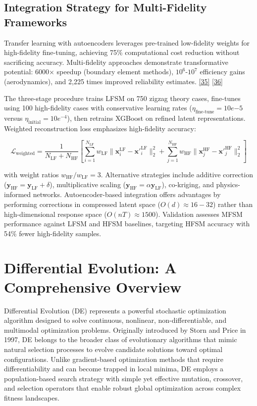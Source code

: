 \documentclass[12pt,a4paper]{report}
\begin{document}
\subsection{Integration Strategy for Multi-Fidelity Frameworks}

Transfer learning with autoencoders leverages pre-trained low-fidelity weights for high-fidelity fine-tuning, achieving 75\% computational cost reduction without sacrificing accuracy. Multi-fidelity approaches demonstrate transformative potential: 6000× speedup (boundary element methods), $10^6$-$10^7$ efficiency gains (aerodynamics), and 2,225 times improved reliability estimates. \href{https://www.mdpi.com/2076-3417/11/21/10317}{[35]} \href{https://arxiv.org/abs/2410.15047}{[36]}

The three-stage procedure trains LFSM on 750 zigzag theory cases, fine-tunes using 100 high-fidelity cases with  conservative learning rates ($\eta_{\text{fine-tune}} = 10e{-5}$ versus $\eta_{\text{initial}} = 10e^{-4}$), then retrains XGBoost on refined latent representations. Weighted reconstruction loss emphasizes high-fidelity accuracy:

\begin{equation}
\mathcal{L}_{\text{weighted}} = \frac{1}{N_{\text{LF}} + N_{\text{HF}}} \left[ \sum_{i=1}^{N_{\text{LF}}} w_{\text{LF}} \|\mathbf{x}^{\text{LF}}_i - \mathbf{x}'^{\text{LF}}_i\|^2_2 + \sum_{j=1}^{N_{\text{HF}}} w_{\text{HF}} \|\mathbf{x}^{\text{HF}}_j - \mathbf{x}'^{\text{HF}}_j\|^2_2 \right]
\end{equation}

with weight ratios $w_{\text{HF}}/w_{\text{LF}} = 3$. Alternative strategies include additive correction ($\mathbf{y}_{\text{HF}} = \mathbf{y}_{\text{LF}} + \delta$), multiplicative scaling ($\mathbf{y}_{\text{HF}} = \alpha \mathbf{y}_{\text{LF}}$), co-kriging, and physics-informed networks. Autoencoder-based integration offers advantages by performing corrections in compressed latent space ($O(d) \approx 16-32$) rather than high-dimensional response space ($O(nT) \approx 1500$). Validation assesses MFSM performance against LFSM and HFSM baselines, targeting HFSM accuracy with 54\% fewer high-fidelity samples.

\section{Differential Evolution: A Comprehensive Overview}
\label{sec:differential_evolution}

Differential Evolution (DE) represents a powerful stochastic optimization algorithm designed to solve continuous, nonlinear, non-differentiable, and multimodal optimization problems. Originally introduced by Storn and Price in 1997, DE belongs to the broader class of evolutionary algorithms that mimic natural selection processes to evolve candidate solutions toward optimal configurations. Unlike gradient-based optimization methods that require differentiability and can become trapped in local minima, DE employs a population-based search strategy with simple yet effective mutation, crossover, and selection operators that enable robust global optimization across complex fitness landscapes.
\end{document}
